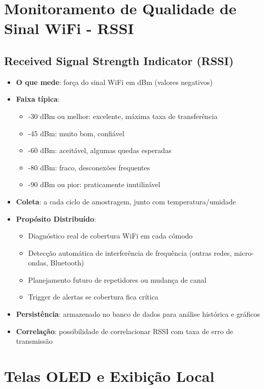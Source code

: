 \documentclass[12pt,a4paper,oneside]{report}
\begin{document}
\section{Monitoramento de Qualidade de Sinal WiFi - RSSI}

\subsection{Received Signal Strength Indicator (RSSI)}
\begin{itemize}[leftmargin=1.2cm]
    \item \textbf{O que mede}: força do sinal WiFi em dBm (valores negativos)
    \item \textbf{Faixa típica}:
    \begin{itemize}
        \item -30 dBm ou melhor: excelente, máxima taxa de transferência
        \item -45 dBm: muito bom, confiável
        \item -60 dBm: aceitável, algumas quedas esperadas
        \item -80 dBm: fraco, desconexões frequentes
        \item -90 dBm ou pior: praticamente inutilizável
    \end{itemize}
    \item \textbf{Coleta}: a cada ciclo de amostragem, junto com temperatura/umidade
    \item \textbf{Propósito Distribuído}: 
    \begin{itemize}
        \item Diagnóstico real de cobertura WiFi em cada cômodo
        \item Detecção automática de interferência de frequência (outras redes, micro-ondas, Bluetooth)
        \item Planejamento futuro de repetidores ou mudança de canal
        \item Trigger de alertas se cobertura fica crítica
    \end{itemize}
    \item \textbf{Persistência}: armazenado no banco de dados para análise histórica e gráficos
    \item \textbf{Correlação}: possibilidade de correlacionar RSSI com taxa de erro de transmissão
\end{itemize}

\section{Telas OLED e Exibição Local}
\end{document}
